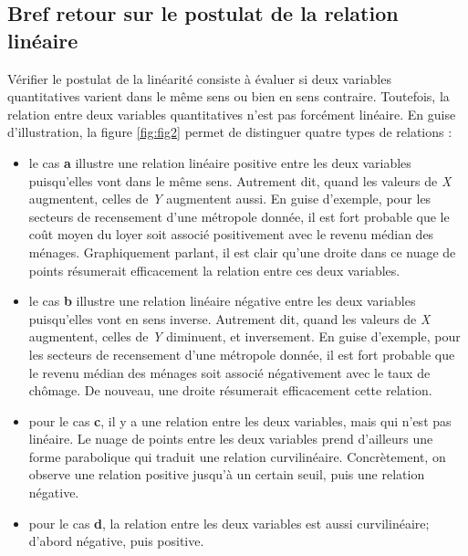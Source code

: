 \documentclass[
  11pt,
  french,
]{book}
\begin{document}
\hypertarget{sect0411}{%
\subsection{Bref retour sur le postulat de la relation linéaire}\label{sect0411}}

Vérifier le postulat de la linéarité consiste à évaluer si deux variables quantitatives varient dans le même sens ou bien en sens contraire. Toutefois, la relation entre deux variables quantitatives n'est pas forcément linéaire. En guise d'illustration, la figure \ref{fig:fig2} permet de distinguer quatre types de relations :

\begin{itemize}
\item
  le cas \textbf{a} illustre une relation linéaire positive entre les deux variables puisqu'elles vont dans le même sens. Autrement dit, quand les valeurs de \emph{X} augmentent, celles de \emph{Y} augmentent aussi. En guise d'exemple, pour les secteurs de recensement d'une métropole donnée, il est fort probable que le coût moyen du loyer soit associé positivement avec le revenu médian des ménages. Graphiquement parlant, il est clair qu'une droite dans ce nuage de points résumerait efficacement la relation entre ces deux variables.
\item
  le cas \textbf{b} illustre une relation linéaire négative entre les deux variables puisqu'elles vont en sens inverse. Autrement dit, quand les valeurs de \emph{X} augmentent, celles de \emph{Y} diminuent, et inversement. En guise d'exemple, pour les secteurs de recensement d'une métropole donnée, il est fort probable que le revenu médian des ménages soit associé négativement avec le taux de chômage. De nouveau, une droite résumerait efficacement cette relation.
\item
  pour le cas \textbf{c}, il y a une relation entre les deux variables, mais qui n'est pas linéaire. Le nuage de points entre les deux variables prend d'ailleurs une forme parabolique qui traduit une relation curvilinéaire. Concrètement, on observe une relation positive jusqu'à un certain seuil, puis une relation négative.
\item
  pour le cas \textbf{d}, la relation entre les deux variables est aussi curvilinéaire; d'abord négative, puis positive.
\end{itemize}
\end{document}
